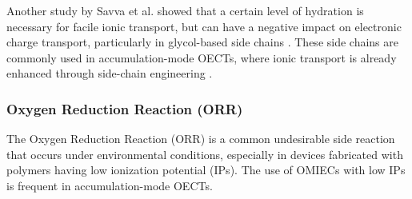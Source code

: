 
Another study by Savva et al. showed that a certain level of hydration is necessary for facile ionic transport, but can have a negative impact on electronic charge transport, particularly in glycol-based side chains \cite{savvaBalancingIonicElectronic2020}. These side chains are commonly used in accumulation-mode OECTs, where ionic transport is already enhanced through side-chain engineering \cite{moiaDesignEvaluationConjugated2019}. %


\subsubsection{Oxygen Reduction Reaction (ORR)}

The Oxygen Reduction Reaction (ORR) is a common undesirable side reaction that occurs under environmental conditions, especially in devices fabricated with polymers having low ionization potential (IPs). The use of OMIECs with low IPs is frequent in accumulation-mode OECTs. 



